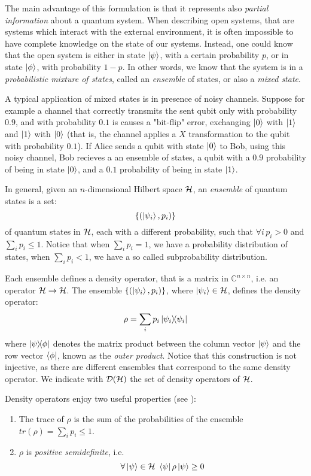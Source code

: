 The main advantage of this formulation is that it represents also \textit{partial information} about a quantum system. When describing open systems, that are systems which interact with the external environment, it is often impossible to have complete knowledge on the state of our systems. Instead, one could know that the open system is either in state $\ket{\psi}$, with a certain probability $p$, or in state $\ket{\phi}$, with probability $1-p$. In other words, we know that the system is in a \textit{probabilistic mixture of states}, called an \textit{ensemble} of states, or also a \textit{mixed state}.

A typical application of mixed states is in presence of noisy channels. Suppose for example a channel that correctly transmits the sent qubit only with probability $0.9$, and with probability $0.1$ is causes a "bit-flip" error, exchanging $\ket{0}$ with $\ket{1}$ and $\ket{1}$ with $\ket{0}$ (that is, the channel applies a $X$ transformation to the qubit with probability $0.1$). If Alice sends a qubit with state $\ket{0}$ to Bob, using this noisy channel, Bob recieves a an ensemble of states, a qubit with a $0.9$ probability of being in state $\ket{0}$, and a $0.1$ probability of being in state $\ket{1}$.


In general, given an $n$-dimensional Hilbert space $\mathcal{H}$, an \textit{ensemble} of quantum states is a set:
\[\{(\ket{\psi_i}, p_i)\} \]
of quantum states in $\mathcal{H}$, each with a different probability, such that $\forall i \, p_i > 0$ and $\sum_i p_i \leq 1$. Notice that when $\sum_i p_i = 1$, we have a probability distribution of states, when $\sum_i p_i < 1$, we have a so called subprobability distribution.

Each ensemble defines a density operator, that is a matrix in $\mathbb{C}^{n \times n}$, i.e. an operator $\mathcal{H} \rightarrow \mathcal{H}$. The ensemble $\{(\ket{\psi_i}, p_i)\}$, where $\ket{\psi_i} \in \mathcal{H}$, defines the density operator: 
\[
	\rho = \sum_i p_i \ket{\psi_i}\!\!\bra{\psi_i}
\]
where $\ket{\psi}\!\!\bra{\phi}$ denotes the matrix product between the column vector $\ket{\psi}$ and the row vector $\bra{\phi}$, known as the \textit{outer product}. Notice that this construction is not injective, as there are different ensembles that correspond to the same density operator. We indicate with $\mathcal{D}(\mathcal{H})$ the set of density operators of $\mathcal{H}$.

Density operators enjoy two useful properties (see \cite{nielsenQuantumComputationQuantum2001}): \begin{enumerate}
\item The trace of $\rho$ is the sum of the probabilities of the ensemble $tr(\rho) = \sum_i p_i \leq 1$.
\item $\rho$ is \textit{positive semidefinite}, i.e. 
\[\forall \ket{\psi} \in \mathcal{H} \ \bra{\psi}\rho\ket{\psi} \geq 0\]
\end{enumerate}

